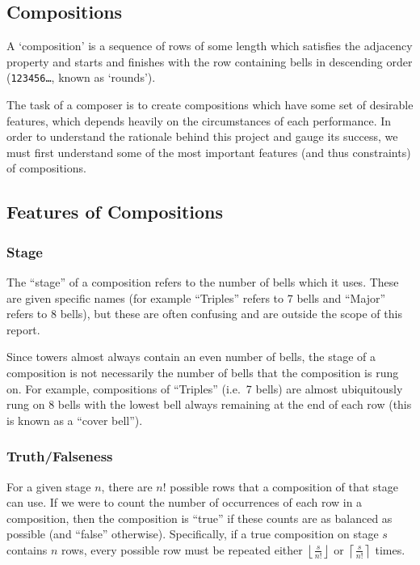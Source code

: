 \documentclass[12pt]{article}
\newcommand{\row}[1]{\texttt{#1}}
\begin{document}
\subsection{Compositions}

A `composition' is a sequence of rows of some length which satisfies the adjacency property and
starts and finishes with the row containing bells in descending order (\row{123456\ldots}, known as
`rounds').

The task of a composer is to create compositions which have some set of desirable features, which
depends heavily on the circumstances of each performance.  In order to understand the
rationale behind this project and gauge its success, we must first understand some of the most
important features (and thus constraints) of compositions.

\subsection{Features of Compositions}\label{sec:features-of-comps}

\subsubsection{Stage}

The ``stage'' of a composition refers to the number of bells which it uses.  These are given
specific names (for example ``Triples'' refers to 7 bells and ``Major'' refers to 8 bells), but
these are often confusing and are outside the scope of this report.

Since towers almost always contain an even number of bells, the stage of a composition is not
necessarily the number of bells that the composition is rung on.  For example, compositions of
``Triples'' (i.e.\ 7 bells) are almost ubiquitously rung on 8 bells with the lowest bell always remaining at the end
of each row (this is known as a ``cover bell'').

\subsubsection{Truth/Falseness}\label{sec:truth}

For a given stage $n$, there are $n!$ possible rows that a composition of that stage can use.  If we
were to count the number of occurrences of each row in a composition, then the composition is
``true'' if these counts are as balanced as possible (and ``false'' otherwise).  Specifically, if a true composition on stage $s$ contains
$n$ rows, every possible row must be repeated either $\left\lfloor \frac{s}{n!} \right\rfloor$ or
$\left\lceil \frac{s}{n!} \right\rceil$ times.
\end{document}
